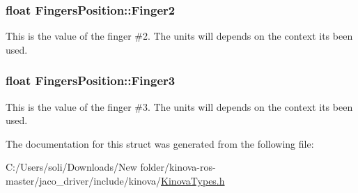 \subsubsection[{\texorpdfstring{Finger2}{Finger2}}]{\setlength{\rightskip}{0pt plus 5cm}float Fingers\+Position\+::\+Finger2}\hypertarget{struct_fingers_position_a0ec9675672721d61fb13bbc2db3d3ef9}{}\label{struct_fingers_position_a0ec9675672721d61fb13bbc2db3d3ef9}


This is the value of the finger \#2. The units will depends on the context it\textquotesingle{}s been used. 

\subsubsection[{\texorpdfstring{Finger3}{Finger3}}]{\setlength{\rightskip}{0pt plus 5cm}float Fingers\+Position\+::\+Finger3}\hypertarget{struct_fingers_position_a03c819e4c20367e36e62a864bf829160}{}\label{struct_fingers_position_a03c819e4c20367e36e62a864bf829160}


This is the value of the finger \#3. The units will depends on the context it\textquotesingle{}s been used. 



The documentation for this struct was generated from the following file\+:\begin{DoxyCompactItemize}
\item 
C\+:/\+Users/soli/\+Downloads/\+New folder/kinova-\/ros-\/master/jaco\+\_\+driver/include/kinova/\hyperlink{_kinova_types_8h}{Kinova\+Types.\+h}\end{DoxyCompactItemize}
